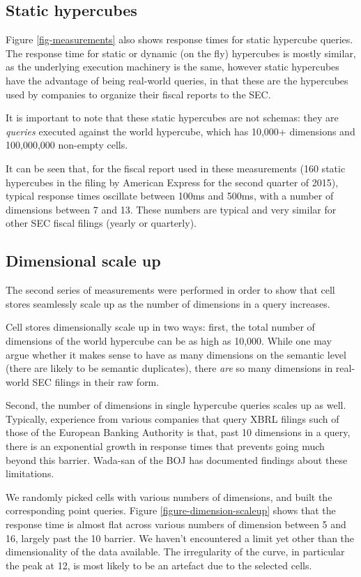 \documentclass{acm_proc_article-sp}
\begin{document}
\subsection{Static hypercubes}
\label{section-static-hypercubes}
Figure \ref{fig-measurements} also shows response times for static hypercube queries. The response time for static or dynamic (on the fly) hypercubes is mostly similar, as the underlying execution machinery is the same, however static hypercubes have the advantage of being real-world queries, in that these are the hypercubes used by companies to organize their fiscal reports to the SEC.

It is important to note that these static hypercubes are not schemas: they are \emph{queries} executed against the world hypercube, which has 10,000+ dimensions and 100,000,000 non-empty cells.

It can be seen that, for the fiscal report used in these measurements (160 static hypercubes in the filing by American Express for the second quarter of 2015), typical response times oscillate between 100ms and 500ms, with a number of dimensions between 7 and 13. These numbers are typical and very similar for other SEC fiscal filings (yearly or quarterly).

\subsection{Dimensional scale up}

The second series of measurements were performed in order to show that cell stores seamlessly scale up as the number of dimensions in a query increases.

Cell stores dimensionally scale up in two ways: first, the total number of dimensions of the world hypercube can be as high as 10,000. While one may argue whether it makes sense to have as many dimensions on the semantic level (there are likely to be semantic duplicates), there \emph{are} so many dimensions in real-world SEC filings in their raw form.

Second, the number of dimensions in single hypercube queries scales up as well. Typically, experience from various companies that query XBRL filings such of those of the European Banking Authority is that, past 10 dimensions in a query, there is an exponential growth in response times that prevents going much beyond this barrier. Wada-san of the BOJ \cite{EBALimits} has documented findings about these limitations.

We randomly picked cells with various numbers of dimensions, and built the corresponding point queries. Figure \ref{figure-dimension-scaleup} shows that the response time is almost flat across various numbers of dimension between 5 and 16, largely past the 10 barrier. We haven't encountered a limit yet other than the dimensionality of the data available. The irregularity of the curve, in particular the peak at 12, is most likely to be an artefact due to the selected cells.
\end{document}
